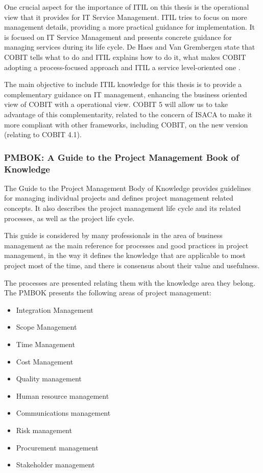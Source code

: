 One crucial aspect for the importance of ITIL on this thesis is the operational view that it provides for IT Service Management. ITIL tries to focus on more management details, providing a more practical guidance for implementation. It is focused on IT Service Management and presents concrete guidance for managing services during its life cycle. De Haes and Van Grembergen state that COBIT tells what to do and ITIL explains how to do it, what makes COBIT adopting a process-focused approach and ITIL a service level-oriented one \cite{ITGovAndMech}.\par
The main objective to include ITIL knowledge for this thesis is to provide a complementary guidance on IT management, enhancing the business oriented view of COBIT with a operational view. COBIT 5 will allow us to take advantage of this complementarity, related to the concern of ISACA to make it more compliant with other frameworks, including COBIT, on the new version (relating to COBIT 4.1). 

\subsubsection{PMBOK: A Guide to the Project Management Book of Knowledge}

The Guide to the Project Management Body of Knowledge provides guidelines for managing individual projects and defines project management related concepts. It also describes the project management life cycle and its related processes, as well as the project life cycle.\cite{pmbok5}\par
This guide is considered by many professionals in the area of business management as the main reference for processes and good practices in project management, in the way it defines the knowledge that are applicable to most project most of the time, and there is consensus about their value and usefulness.\par 
The processes are presented relating them with the knowledge area they belong. The PMBOK presents the following areas of project management:

\begin{itemize}
  \item Integration Management
  \item Scope Management
  \item Time Management
  \item Cost Management
  \item Quality management
  \item Human resource management
  \item Communications management
  \item Risk management
  \item Procurement management
  \item Stakeholder management
\end{itemize} 

